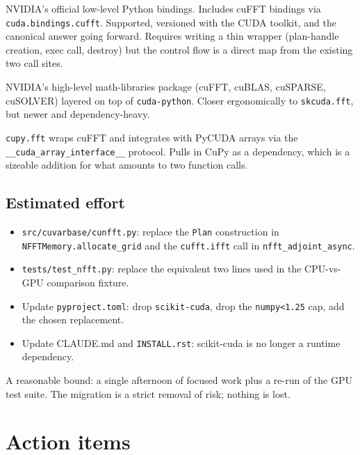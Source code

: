 \documentclass[11pt,a4paper]{article}
\begin{document}
\begin{description}[leftmargin=1.6em,style=nextline]
    \item[\texttt{cuda-python} (\texttt{nvidia-cuda-python})]
    NVIDIA's official low-level Python bindings. Includes cuFFT bindings via
    \texttt{cuda.bindings.cufft}. Supported, versioned with the CUDA toolkit,
    and the canonical answer going forward. Requires writing a thin wrapper
    (plan-handle creation, exec call, destroy) but the control flow is a
    direct map from the existing two call sites.

    \item[\texttt{nvmath-python}]
    NVIDIA's high-level math-libraries package (cuFFT, cuBLAS, cuSPARSE,
    cuSOLVER) layered on top of \texttt{cuda-python}. Closer ergonomically to
    \texttt{skcuda.fft}, but newer and dependency-heavy.

    \item[\texttt{cupy}]
    \texttt{cupy.fft} wraps cuFFT and integrates with PyCUDA arrays via the
    \texttt{\_\_cuda\_array\_interface\_\_} protocol. Pulls in CuPy as a
    dependency, which is a sizeable addition for what amounts to two function
    calls.
\end{description}

\subsection*{Estimated effort}
\begin{itemize}[leftmargin=1.6em]
    \item \texttt{src/cuvarbase/cunfft.py}: replace the \texttt{Plan}
    construction in \texttt{NFFTMemory.allocate\_grid} and the
    \texttt{cufft.ifft} call in \texttt{nfft\_adjoint\_async}.
    \item \texttt{tests/test\_nfft.py}: replace the equivalent two lines used
    in the CPU-vs-GPU comparison fixture.
    \item Update \texttt{pyproject.toml}: drop \texttt{scikit-cuda}, drop the
    \texttt{numpy<1.25} cap, add the chosen replacement.
    \item Update CLAUDE.md and \texttt{INSTALL.rst}: scikit-cuda is no longer
    a runtime dependency.
\end{itemize}

\noindent
A reasonable bound: a single afternoon of focused work plus a re-run of the
GPU test suite. The migration is a strict removal of risk; nothing is lost.

\section{Action items}
\end{document}
